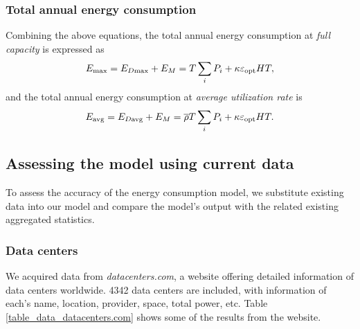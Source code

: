 \documentclass[12pt]{article}
\begin{document}
\subsubsection{Total annual energy consumption}

Combining the above equations, the total annual energy consumption at \textit{full capacity} is expressed as
\begin{equation}
	E_{\rm max} = E_{D \rm max} + E_M = T \sum_i P_i + \kappa \varepsilon_{\rm opt} HT,
\end{equation}
and the total annual energy consumption at \textit{average utilization rate} is
\begin{equation}
	E_{\rm avg} = E_{D \rm avg} + E_M = \overline{\rho} T \sum_i P_i + \kappa \varepsilon_{\rm opt} HT.
\end{equation}

\subsection{Assessing the model using current data}

To assess the accuracy of the energy consumption model, we substitute existing data into our model and compare the model's output with the related existing aggregated statistics.

\subsubsection{Data centers}

We acquired data from \textit{datacenters.com}, a website offering detailed information of data centers worldwide. 4342 data centers \citep{datacenters_com} are included, with information of each's name, location, provider, space, total power, etc. Table \ref{table_data_datacenters.com} shows some of the results from the website.
\end{document}
